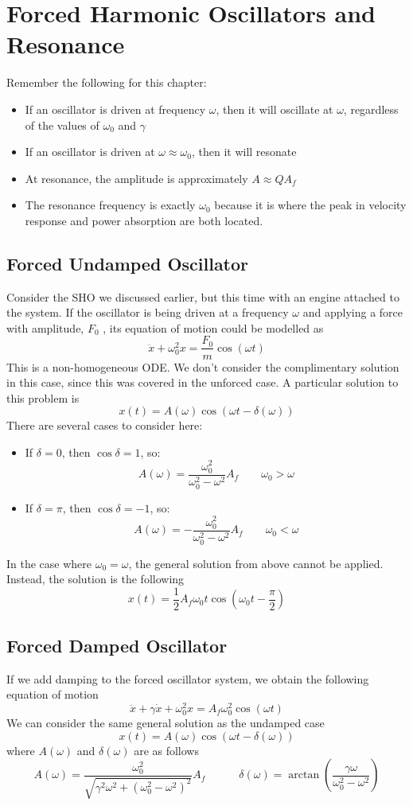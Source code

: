 \documentclass[11pt]{article}
\begin{document}
\section{Forced Harmonic Oscillators and Resonance}
Remember the following for this chapter:
\begin{itemize}
\item If an oscillator is driven at frequency $\omega$, then it will oscillate at $\omega$, regardless of the values of $\omega_0$ and $\gamma$
\item If an oscillator is driven at $\omega \approx \omega_0$, then it will resonate
\item At resonance, the amplitude is approximately $A \approx QA_f$
\item The resonance frequency is exactly $\omega_0$ because it is where the peak in velocity response and power absorption are both located.
\end{itemize}

\subsection{Forced Undamped Oscillator}
Consider the SHO we discussed earlier, but this time with an engine attached to the system. If the oscillator is being driven at a frequency $\omega$ and applying a force with amplitude, $F_0$ , its equation of motion could be modelled as $$ \ddot x + \omega_0^2 x = \frac{F_0}{m} \cos (\omega t)$$
This is a non-homogeneous ODE. We don't consider the complimentary solution in this case, since this was covered in the unforced case. A particular solution to this problem is 
$$ x(t) = A(\omega)\cos (\omega t - \delta(\omega))$$
There are several cases to consider here:
\begin{itemize}
\item If $\delta = 0$, then $\cos \delta = 1$, so:
$$ A(\omega) = \frac{\omega_0^2}{\omega_0^2 - \omega^2} A_f \quad \quad \omega_0 > \omega $$
\item If $\delta = \pi$, then $\cos \delta = -1$, so:
$$ A(\omega) = -\frac{\omega_0^2}{\omega_0^2 - \omega^2} A_f\quad \quad \omega_0 < \omega $$
\end{itemize}
In the case where $\omega_0 = \omega$, the general solution from above cannot be applied. Instead, the solution is the following $$ x(t) = \frac{1}{2}A_f\omega_0 t \cos \left(\omega_0 t - \frac{\pi}{2}\right)$$
\subsection{Forced Damped Oscillator}
If we add damping to the forced oscillator system, we obtain the following equation of motion $$ \ddot x + \gamma \dot{x} + \omega_0^2 x = A_f \omega_0^2 \cos (\omega t)$$ 
We can consider the same general solution as the undamped case
$$ x(t) = A(\omega)\cos (\omega t - \delta(\omega))$$
where $A(\omega)$ and $\delta(\omega)$ are as follows
$$ A(\omega) = \frac{\omega_0^2}{\sqrt{\gamma^2 \omega^2 + (\omega_0^2-\omega^2)^2}} A_f \quad \quad \quad \delta(\omega) = \arctan \left(\frac{\gamma \omega}{\omega_0^2 - \omega^2}\right)$$
\end{document}
